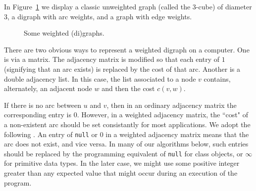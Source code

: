 In Figure~\ref{fig:graphExample5} we display a classic unweighted graph
(called the $3$-cube) of diameter $3$, a digraph with arc weights, and a
graph with edge weights.

\begin{figure}
\centerline{}

\caption{Some weighted (di)graphs.}
\label{fig:graphExample5}
\end{figure}

There are two obvious ways to represent a weighted digraph on a
computer. One is via a matrix. The adjacency matrix is modified so that
each entry of $1$ (signifying that an arc exists) is replaced by the
cost of that arc. Another is a double adjacency list. In this case, the
list associated to a node $v$ contains, alternately, an adjacent node
$w$ and then the cost $c(v, w)$.  

If there is no arc between $u$ and $v$, then in an ordinary adjacency
matrix the corresponding entry is $0$. However, in a weighted adjacency
matrix, the ``cost" of a non-existent arc should be set consistantly 
for most applications. We adopt the following . 
An entry of \verb|null| or $0$ in a weighted 
adjacency matrix
means that the arc does not exist, and vice versa. In many of our
algorithms below, such entries should be replaced by the programming
equivalent of \verb|null| for class objects, or $\infty$ for 
primitive data types.  In the later case, we might use some positive 
integer greater than any expected value that might occur during
an execution of the program. 


